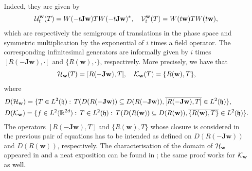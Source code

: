 \documentclass[preprint]{elsarticle}
\theoremstyle{definition}
\def\hh{\mathfrak{h} }
\def\RR{\mathbb{R}}
\def\hh{\mathfrak{h}}
\begin{document}
Indeed, they are given by
$${\cal U}^{\mathbf{w}}_t(T)=W(-t\mathbf{J}\mathbf{w})TW(-t\mathbf{J}\mathbf{w})^*, \quad {\cal V}^{\mathbf{w}}_t(T)=W(t\mathbf{w})TW(t\mathbf{w}),
$$
which are respectively the semigroups of translations in the phase space and symmetric multiplication by the exponential of $i$ times a field operator. The corresponding infinitesimal generators are informally given by $i$ times $[R(-\mathbf{J}\mathbf{w}),\cdot]$ and $\{R(\mathbf{w}),\cdot\}$, respectively. More precisely, we have that
$${\cal H}_{\mathbf{w}}(T)=[R(-\mathbf{J}\mathbf{w}),T], \quad  {\cal K}_{\mathbf{w}}(T)=\{R(\mathbf{w}),T\},$$
where
\begin{align}\label{eq:domains}
&D({\cal H}_{\mathbf{w}})=\{T \in L^2(\hh):\,T(D(R(-\mathbf{J}\mathbf{w}))\subseteq D(R(-\mathbf{J}\mathbf{w})), \overline{[R(-\mathbf{J}\mathbf{w}),T]} \in L^2(\hh)\},\\
&D({\cal K}_{\mathbf{w}})=\{f \in L^2(\RR^{2d}):\,T \in L^2(\hh):\,T(D(R(\mathbf{w}))\subseteq D(R(\mathbf{w})), \overline{\{R(\mathbf{w}),T\}} \in L^2(\hh)\}.
\end{align}
The operators $[R(-\mathbf{Jw}),T]$ and $\{R(\mathbf{w}), T\}$ whose closure is considered in the previous pair of equations has to be intended as defined on $D(R(-\mathbf{Jw}))$ and $D(R(\mathbf{w}))$, respectively. The characterisation of the domain of ${\cal H}_\mathbf{w}$ appeared in \cite{Co82} and a neat exposition can be found in \cite[Theorem 3.6]{LHB24}; the same proof works for ${\cal K}_\mathbf{w}$ as well.
\end{document}
